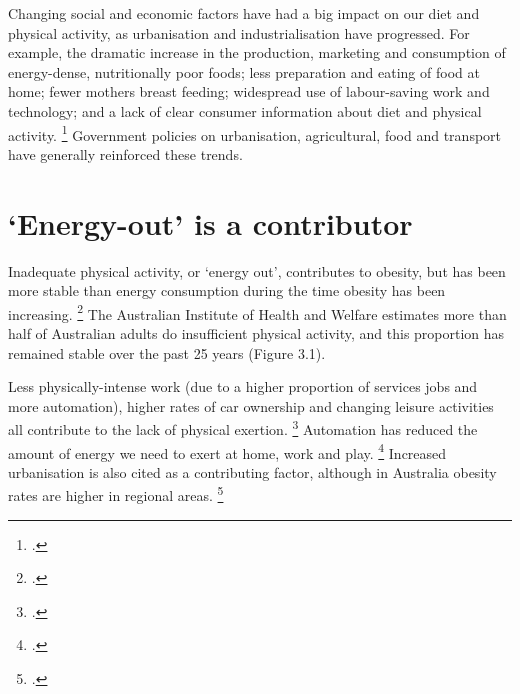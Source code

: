 \documentclass[embargoed]{grattan}
\begin{document}
Changing social and economic factors have had a big impact on our diet and physical activity, as urbanisation and industrialisation have progressed.
For example, the dramatic increase in the production, marketing and consumption of energy-dense, nutritionally poor foods; less preparation and eating of food at home; fewer mothers breast feeding; widespread use of labour-saving work and technology; and a lack of clear consumer information about diet and physical activity.%
\footcites{Livingston2012JAMAobesitytheme}{Ewart-Pierce2016WholeCommunityObesity}{Roberto2015Patchyprogressobesity}{Keith2006Putativecontributorssecular}{Wright2012Causesobesity}{Lakdawalla2009growthobesitytechnological}{Popkin2004nutritiontransitionworldwide}{Popkin2001nutritiontransitionobesity}{Karnani2016ObesityCrisisas}{Bray2004Consumptionhighfructose}{Organisation2000Obesitypreventingmanaging}{Swinburn2004Dietnutritionprevention} Government policies on urbanisation, agricultural, food and transport have generally reinforced these trends.



\section{`Energy-out' is a contributor }\label{energy-out-is-a-contributor}

Inadequate physical activity, or `energy out', contributes to obesity, but has been more stable than energy consumption during the time obesity has been increasing.%
\footcites{Keith2006Putativecontributorssecular}{Popkin2004nutritiontransitionworldwide}{Stubbs2004obesityepidemicboth} The Australian Institute of Health and Welfare estimates more than half of Australian adults do insufficient physical activity, and this proportion has remained stable over the past 25 years (Figure 3.1).

Less physically-intense work (due to a higher proportion of services jobs and more automation), higher rates of car ownership and changing leisure activities all contribute to the lack of physical exertion. \footcites{Popkin2004nutritiontransitionworldwide}{Finkelstein2010EconomicsObesity}{Popkin1998obesityepidemicis}{Drewnowski1997nutritiontransitionnew} Automation has reduced the amount of energy we need to exert at home, work and play.%
\footcites{Caballero2007globalepidemicobesity}{Popkin2004nutritiontransitionworldwide} Increased urbanisation is also cited as a contributing factor, although in Australia obesity rates are higher in regional areas.%
\footcites{Popkin1998obesityepidemicis}{Drewnowski1997nutritiontransitionnew}
\end{document}
